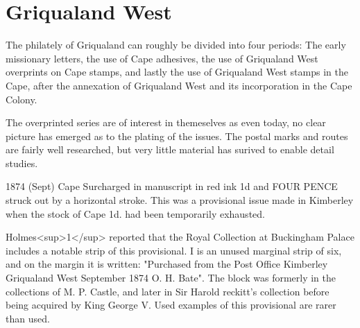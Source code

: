 
\chapter{Griqualand West}

The philately of Griqualand can roughly be divided into four periods: The early missionary letters, the use of Cape adhesives, the use of Griqualand West overprints on Cape stamps, and lastly the use of Griqualand West stamps in the Cape, after the annexation of Griqualand West and its incorporation in the Cape Colony. 


The overprinted series are of interest in themeselves as even today, no clear picture has emerged as to the plating of the issues. The postal marks and routes are fairly well researched, but very little material has surived to enable detail studies.


1874 (Sept) Cape Surcharged in manuscript in red ink 1d and FOUR PENCE struck out by a horizontal stroke. This was a provisional issue made in Kimberley when the stock of Cape 1d. had been temporarily exhausted.



Holmes<sup>1</sup> reported that the Royal Collection at Buckingham Palace includes a 
notable strip of this provisional. I is an unused marginal strip of six, and on the margin it is written: "Purchased from the Post Office Kimberley Griqualand West September 1874 O. H. Bate". The block was formerly in the collections of M. P. Castle, and later in Sir Harold reckitt's collection before being acquired by King George V. Used examples of this provisional are rarer than used.



\hline


